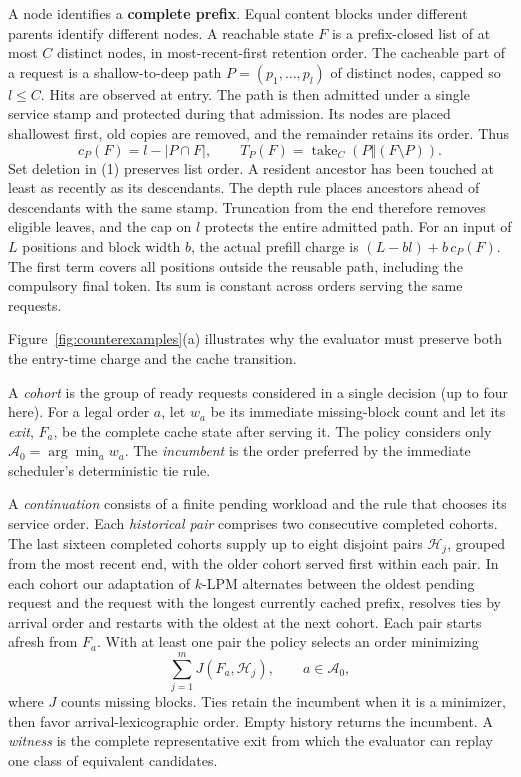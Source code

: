 \documentclass[11pt,letterpaper]{article}
\begin{document}
A node identifies a \textbf{complete prefix}. Equal content blocks under different parents identify different nodes. A reachable state $F$ is a prefix-closed list of at most $C$ distinct nodes, in most-recent-first retention order. The cacheable part of a request is a shallow-to-deep path $P=(p_1,\ldots,p_l)$ of distinct nodes, capped so $l\le C$. Hits are observed at entry. The path is then admitted under a single service stamp and protected during that admission. Its nodes are placed shallowest first, old copies are removed, and the remainder retains its order. Thus
\[
 c_P(F)=l-|P\cap F|,\qquad
 T_P(F)=\operatorname{take}_C\!\left(P\mathbin\Vert(F\setminus P)\right).
 \tag{1}
\]
Set deletion in (1) preserves list order. A resident ancestor has been touched at least as recently as its descendants. The depth rule places ancestors ahead of descendants with the same stamp. Truncation from the end therefore removes eligible leaves, and the cap on $l$ protects the entire admitted path. For an input of $L$ positions and block width $b$, the actual prefill charge is $(L-bl)+b\,c_P(F)$. The first term covers all positions outside the reusable path, including the compulsory final token. Its sum is constant across orders serving the same requests.

Figure~\ref{fig:counterexamples}(a) illustrates why the evaluator must preserve both the entry-time charge and the cache transition.

A \emph{cohort} is the group of ready requests considered in a single decision (up to four here). For a legal order $a$, let $w_a$ be its immediate missing-block count and let its \emph{exit}, $F_a$, be the complete cache state after serving it. The policy considers only $\mathcal A_0=\arg\min_a w_a$. The \emph{incumbent} is the order preferred by the immediate scheduler's deterministic tie rule.

A \emph{continuation} consists of a finite pending workload and the rule that chooses its service order. Each \emph{historical pair} comprises two consecutive completed cohorts. The last sixteen completed cohorts supply up to eight disjoint pairs $\mathcal H_j$, grouped from the most recent end, with the older cohort served first within each pair. In each cohort our adaptation of $k$-LPM alternates between the oldest pending request and the request with the longest currently cached prefix, resolves ties by arrival order and restarts with the oldest at the next cohort. Each pair starts afresh from $F_a$. With at least one pair the policy selects an order minimizing
\[
                 \sum_{j=1}^{m} J(F_a,\mathcal H_j),\qquad a\in\mathcal A_0,
\]
where $J$ counts missing blocks. Ties retain the incumbent when it is a minimizer, then favor arrival-lexicographic order. Empty history returns the incumbent. A \emph{witness} is the complete representative exit from which the evaluator can replay one class of equivalent candidates.
\end{document}

